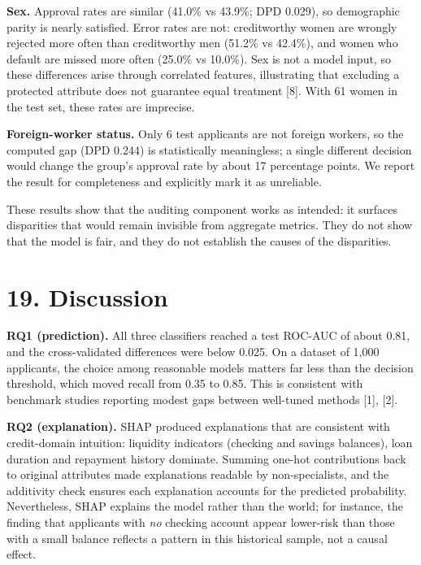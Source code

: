 \documentclass[
  11pt,
]{article}
\begin{document}
\textbf{Sex.} Approval rates are similar (41.0\% vs 43.9\%; DPD 0.029),
so demographic parity is nearly satisfied. Error rates are not:
creditworthy women are wrongly rejected more often than creditworthy men
(51.2\% vs 42.4\%), and women who default are missed more often (25.0\%
vs 10.0\%). Sex is not a model input, so these differences arise through
correlated features, illustrating that excluding a protected attribute
does not guarantee equal treatment {[}8{]}. With 61 women in the test
set, these rates are imprecise.

\textbf{Foreign-worker status.} Only 6 test applicants are not foreign
workers, so the computed gap (DPD 0.244) is statistically meaningless; a
single different decision would change the group's approval rate by
about 17 percentage points. We report the result for completeness and
explicitly mark it as unreliable.

These results show that the auditing component works as intended: it
surfaces disparities that would remain invisible from aggregate metrics.
They do not show that the model is fair, and they do not establish the
causes of the disparities.

\hypertarget{discussion}{%
\section{19. Discussion}\label{discussion}}

\textbf{RQ1 (prediction).} All three classifiers reached a test ROC-AUC
of about 0.81, and the cross-validated differences were below 0.025. On
a dataset of 1,000 applicants, the choice among reasonable models
matters far less than the decision threshold, which moved recall from
0.35 to 0.85. This is consistent with benchmark studies reporting modest
gaps between well-tuned methods {[}1{]}, {[}2{]}.

\textbf{RQ2 (explanation).} SHAP produced explanations that are
consistent with credit-domain intuition: liquidity indicators (checking
and savings balances), loan duration and repayment history dominate.
Summing one-hot contributions back to original attributes made
explanations readable by non-specialists, and the additivity check
ensures each explanation accounts for the predicted probability.
Nevertheless, SHAP explains the model rather than the world; for
instance, the finding that applicants with \emph{no} checking account
appear lower-risk than those with a small balance reflects a pattern in
this historical sample, not a causal effect.
\end{document}

